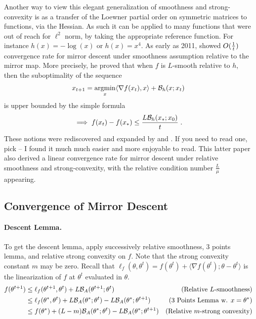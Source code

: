 \documentclass{article}
\newcommand{\logpart}{A}
\newcommand{\bregman}{\cB_\logpart}
\newcommand{\nat}{\theta}
\begin{document}
Another way to view this elegant generalization of smoothness and strong-convexity is as a transfer of the Loewner partial order on symmetric matrices to functions, via the Hessian. 
As such it can be applied to many functions that were out of reach for $\ell^2$ norm, by taking the appropriate reference function.  For instance $h(x) = -\log(x)$ or $h(x) = x^4$. 
As early as 2011, \citet{birnbaum2011distributed} showed $O(\frac{1}{t})$ convergence rate for mirror descent under smoothness assumption relative to the mirror map. 
More precisely, he proved that when $f$ is $L$-smooth relative to $h$, then the suboptimality of the sequence 
\begin{align}
	x_{t+1}  = \operatorname*{argmin}_x \langle \nabla f(x_t), x \rangle + {\mathcal B}_h(x ; x_t)
\end{align}
is upper bounded by the simple formula
\begin{align}
	\implies f(x_t) - f(x_*) \leq \frac{L {\mathcal B}_h(x_* ; x_0) }{t} \; .
\end{align}
These notions were rediscovered and expanded by \citet{bauschke2017descent} and \citet{lu2018relatively}. If you need to read one, pick \citet{lu2018relatively} -- I found it much much easier and more enjoyable to read.  This latter paper also derived a linear convergence rate for mirror descent under relative smoothness and strong-convexity, with the relative condition number $\frac{L}{\mu}$ appearing.


\subsection{Convergence of Mirror Descent}
\paragraph{Descent Lemma.}
To get the descent lemma, apply successively relative smoothness, 3 points lemma, and relative strong convexity on $f$. Note that the strong convexity constant $m$ may be zero. Recall that $\ell_f(\nat, \nat^{t}) = f(\nat^t) + \langle \nabla f (\nat^t) ; \nat - \nat^t \rangle $ is the linearization of $f$ at $\nat^t$ evaluated in $\nat$. 
\begin{align}
	f(\nat^{t+1}) 
	&\leq \ell_f(\nat^{t+1}, \nat^{t})  + L \bregman(\nat^{t+1}; \nat^{t})
	& \text{(Relative $L$-smoothness)} \\
	& \leq \ell_f(\nat^{*}, \nat^{t})  + L \bregman(\nat^{*}; \nat^{t}) -L \bregman(\nat^{*}; \nat^{t+1}) 
	& \text{(3 Points Lemma w. $x=\nat^*$)} \\
	& \leq f(\nat^*) + (L - m) \bregman(\nat^{*}; \nat^{t}) -L \bregman(\nat^{*}; \nat^{t+1}) 
	& \text{(Relative $m$-strong convexity)}
\end{align}
\end{document}
